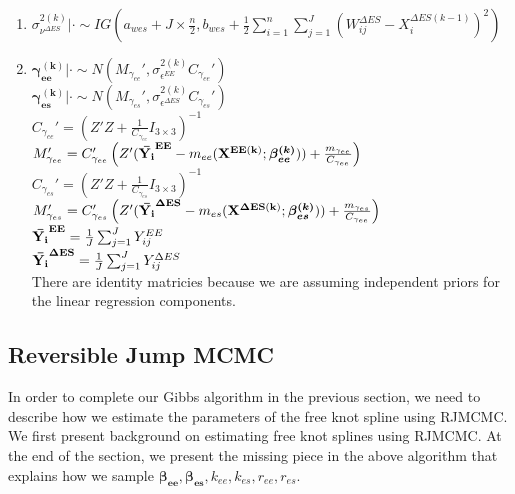 \documentclass[11pt]{article}\usepackage[]{graphicx}\usepackage[]{color}
\begin{document}
\begin{enumerate}
\begin{enumerate}
\item
 $\sigma^{2(k)}_{\nu^{\Delta ES}} |\cdot \sim IG(a_{wes}+J\times \frac{n}{2},b_{wes}+\frac{1}{2}\sum_{i=1}^{n}\sum_{j=1}^{J}(W_{ij}^{\Delta ES}-X_i^{\Delta ES(k-1)})^2)$ \\


\item
$\boldsymbol{\gamma_{ee}^{(k)}}|\cdot \sim N(M_{\gamma_{ee}}',\sigma^{2(k)}_{\epsilon^{EE}} C_{\gamma_{ee}}')$ \\
$\boldsymbol{\gamma_{es}^{(k)}}|\cdot \sim N(M_{\gamma_{es}}',\sigma^{2(k)}_{\epsilon^{\Delta ES}} C_{\gamma_{es}}')$ \\

$C_{\gamma_{ee}}' = \left(  Z'Z + \frac{1}{C_{\gamma_{ee}}} I_{3 \times 3} \right)^{-1} $\\
$M_{\gamma_{ee}}' = C_{\gamma_{ee}}' \left(  Z'({\bf \bar{Y_i}^{EE}} - m_{ee}({\bf X^{EE(k)}};\boldsymbol{\beta_{ee}^{(k)}})) + \frac{m_{\gamma_{ee}}}{C_{\gamma_{ee}} } \right)$ \\

$C_{\gamma_{es}}' = \left(  Z'Z + \frac{1}{C_{\gamma_{es}}} I_{3 \times 3} \right)^{-1} $\\
$M_{\gamma_{es}}' = C_{\gamma_{es}}' \left(  Z'({\bf \bar{Y_i}^{\Delta ES}} - m_{es}({\bf X^{\Delta ES(k)}};\boldsymbol{\beta_{es}^{(k)}})) + \frac{m_{\gamma_{es}}}{C_{\gamma_{ee}} } \right)$ \\

${\bf \bar{Y_i}^{EE}} = \frac{1}{J} \sum_{j=1}^{J} Y_{ij}^{EE}$ \\
${\bf \bar{Y_i}^{\Delta ES}} = \frac{1}{J} \sum_{j=1}^{J} Y_{ij}^{\Delta ES}$ \\

There are identity matricies because we are assuming independent priors for the linear regression components. 
\end{enumerate}

\end{enumerate}



\subsection{Reversible Jump MCMC}
In order to complete our Gibbs algorithm in the previous section, we need to describe how we estimate the parameters of the free knot spline using RJMCMC. We first present background on estimating free knot splines using RJMCMC. At the end of the section, we present the missing piece in the above algorithm that explains how we sample ${\boldsymbol{\beta_{ee}},\boldsymbol{\beta_{es}}},k_{ee},k_{es}, {  r_{ee}, r_{es}}$. 
\end{document}

